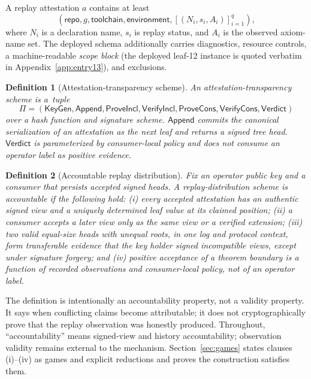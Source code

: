 \documentclass[11pt]{article}
\newtheorem{definition}{Definition}
\theoremstyle{remark}
\begin{document}
A replay attestation $a$ contains at least
\[
(\textsf{repo},g,\textsf{toolchain},\textsf{environment},
  [(N_i,s_i,A_i)]_{i=1}^{q}),
\]
where $N_i$ is a declaration name, $s_i$ is replay status, and $A_i$ is the
observed axiom-name set. The deployed schema additionally carries diagnostics,
resource controls, a machine-readable \emph{scope block} (the deployed
leaf-12 instance is quoted verbatim in Appendix~\ref{app:entry13}), and exclusions.

\begin{definition}[Attestation-transparency scheme]
An attestation-transparency scheme is a~\mbox{tuple}
\[
\Pi=(\mathsf{KeyGen},\mathsf{Append},\mathsf{ProveIncl},
\mathsf{VerifyIncl},\mathsf{ProveCons},\mathsf{VerifyCons},\mathsf{Verdict})
\]
over a hash function and signature scheme. $\mathsf{Append}$ commits the
canonical serialization of an attestation as the next leaf and returns a signed
tree head. $\mathsf{Verdict}$ is parameterized by consumer-local policy and
does not consume an operator label as positive evidence.
\end{definition}

\begin{definition}[Accountable replay distribution]
Fix an operator public key and a consumer that persists accepted signed heads.
A replay-distribution scheme is \emph{accountable} if the following hold:
(i) every accepted attestation has an authentic signed view and a uniquely
determined leaf value at its claimed position; (ii) a
consumer accepts a later view only as the same view or a verified extension;
(iii) two valid equal-size heads with unequal roots, in one log and protocol
context, form transferable evidence
that the key holder signed incompatible views, except under signature
forgery; and (iv) positive acceptance of
a theorem boundary is a function of recorded observations and consumer-local
policy, not of an operator label.
\end{definition}

The definition is intentionally an accountability property, not a validity
property. It says when conflicting claims become attributable; it does not
cryptographically prove that the replay observation was honestly produced.
Throughout, ``accountability'' means signed-view and history accountability;
observation validity remains external to the mechanism.
Section~\ref{sec:games} states clauses (i)--(iv) as games and explicit
reductions and proves the construction satisfies them.
\end{document}
